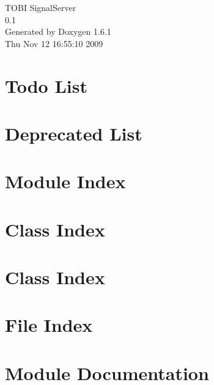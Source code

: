 \documentclass[a4paper]{article}
\begin{document}
\hypersetup{pageanchor=false}
\begin{titlepage}
\vspace*{7cm}
\begin{center}
{\Large TOBI SignalServer \\[1ex]\large 0.1 }\\
\vspace*{1cm}
{\large Generated by Doxygen 1.6.1}\\
\vspace*{0.5cm}
{\small Thu Nov 12 16:55:10 2009}\\
\end{center}
\end{titlepage}
\tableofcontents
{}
\hypersetup{pageanchor=true}
\section{Todo List}
\label{todo}
\hypertarget{todo}{}

\section{Deprecated List}
\label{deprecated}
\hypertarget{deprecated}{}

\section{Module Index}

\section{Class Index}

\section{Class Index}

\section{File Index}

\section{Module Documentation}



\end{document}

